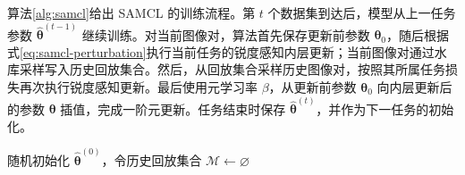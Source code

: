 算法\ref{alg:samcl}给出 SAMCL 的训练流程。第 $t$ 个数据集到达后，模型从上一任务参数
$\widehat{\boldsymbol{\theta}}^{(t-1)}$ 继续训练。对当前图像对，算法首先保存更新前参数 $\boldsymbol{\theta}_0$，随后根据式\eqref{eq:samcl-perturbation}执行当前任务的锐度感知内层更新；当前图像对通过水库采样写入历史回放集合。然后，从回放集合采样历史图像对，按照其所属任务损失再次执行锐度感知更新。最后使用元学习率 $\beta$，从更新前参数 $\boldsymbol{\theta}_0$ 向内层更新后的参数 $\boldsymbol{\theta}$ 插值，完成一阶元更新。任务结束时保存
$\widehat{\boldsymbol{\theta}}^{(t)}$，并作为下一任务的初始化。

\begin{algorithm}[htbp]
\caption{锐度感知元持续医学图像配准（SAMCL）}
\label{alg:samcl}
随机初始化 $\widehat{\boldsymbol{\theta}}^{(0)}$，令历史回放集合 $\mathcal{M}\leftarrow\varnothing$\;
\;
\end{algorithm}

